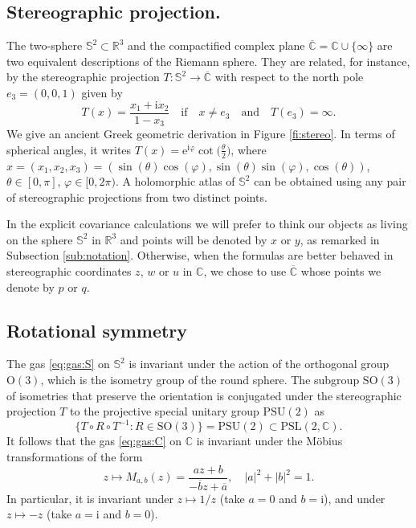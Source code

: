 \documentclass[10pt,reqno]{amsart}
\numberwithin{equation}{section}
\numberwithin{figure}{section}
\theoremstyle{plain}
\newcommand{\<}{\langle}
\renewcommand{\>}{\rangle}
\begin{document}
\subsection{Stereographic projection.}
The two-sphere 
$\mathbb{S}^2\subset\mathbb{R}^3$ and the
compactified complex plane $\overline{\mathbb{C}}=\mathbb{C}\cup\{\infty\}$
are two equivalent descriptions of
the Riemann sphere. They are related, for instance, by the stereographic projection
$T:\mathbb{S}^2\to\overline{\mathbb{C}}$ with respect to the north pole $e_3 = (0,0,1)$
given by
\begin{equation}\label{eq:T}
  T(x)=\frac{x_1+\mathrm{i}x_2}{1-x_3}
  \quad\text{if}\quad x\neq e_3\quad\text{and}\quad T(e_3)=\infty.
\end{equation}
We give an ancient Greek geometric derivation in Figure \ref{fi:stereo}. In terms of
spherical angles, it writes
$T(x)=\mathrm{e}^{\mathrm{i\varphi}}\cot\bigl(\frac{\theta}{2}\bigr)$, where
$x=(x_1,x_2,x_3)=(\sin(\theta)\cos(\varphi),\sin(\theta)\sin(\varphi),\cos(\theta))$,
$\theta\in[0,\pi]$, $\varphi\in[0,2\pi)$. 
A holomorphic atlas of $\mathbb{S}^2$
can be obtained
using 
any pair of stereographic projections from two distinct points.

In the explicit covariance calculations we will prefer to 
think our objects as living on the 
sphere $\mathbb S^2$ in $\mathbb R^3$
and points will be denoted by $x$ or $y$,
as remarked in Subsection \ref{sub:notation}.
Otherwise, when the formulas are better behaved
in stereographic coordinates $z$, $w$ or $u$ in $\mathbb C$, we chose to use
$\overline {\mathbb C}$ whose points we denote by
$p$ or $q$.


\subsection{Rotational symmetry} The gas \eqref{eq:gas:S} on $\mathbb{S}^2$ is
invariant under the action of the orthogonal group $\mathrm{O}(3)$, which is the isometry group
of the round sphere. The
subgroup $\mathrm{SO}(3)$
of isometries that preserve the orientation is conjugated under the stereographic projection $T$ to
the projective special unitary group $\mathrm{PSU}(2)$ as
\begin{equation}
 \{T\circ R\circ T^{-1}:R\in\mathrm{SO}(3)\} = \mathrm{PSU}(2)\subset\mathrm{PSL}(2,\mathbb{C}).
\end{equation}
It follows that the gas \eqref{eq:gas:C} on $\mathbb{C}$ is invariant under
the Möbius transformations of the form 
\begin{equation}
    z\mapsto M_{a,b}(z)=\frac{az+b}{-\overline{b}z+\overline{a}},\quad |a|^2+|b|^2=1.
\end{equation}
In particular, it is invariant under $z\mapsto 1/z$ (take $a=0$ and $b=\mathrm{i}$), and under $z\mapsto -z$ (take $a=\mathrm{i}$ and $b=0$).
\end{document}
